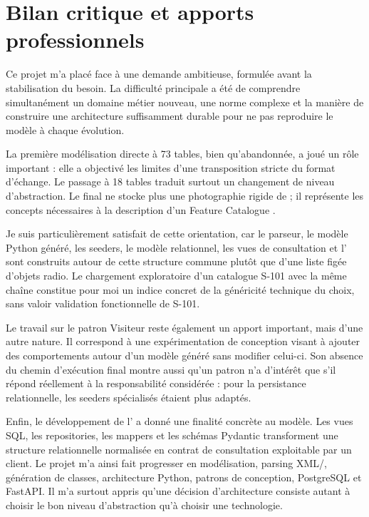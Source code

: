 \section{Bilan critique et apports professionnels}

Ce projet m'a placé face à une demande ambitieuse, formulée avant la stabilisation du besoin. La difficulté principale a été de comprendre simultanément un domaine métier nouveau, une norme complexe et la manière de construire une architecture suffisamment durable pour ne pas reproduire le modèle à chaque évolution.

La première modélisation directe à 73 tables, bien qu'abandonnée, a joué un rôle important : elle a objectivé les limites d'une transposition stricte du format d'échange. Le passage à 18 tables traduit surtout un changement de niveau d'abstraction. Le  final ne stocke plus une photographie rigide de  ; il représente les concepts nécessaires à la description d'un Feature Catalogue .

Je suis particulièrement satisfait de cette orientation, car le parseur, le modèle Python généré, les seeders, le modèle relationnel, les vues de consultation et l' sont construits autour de cette structure commune plutôt que d'une liste figée d'objets radio. Le chargement exploratoire d'un catalogue S-101 avec la même chaîne constitue pour moi un indice concret de la généricité technique du choix, sans valoir validation fonctionnelle de S-101.

Le travail sur le patron Visiteur reste également un apport important, mais d'une autre nature. Il correspond à une expérimentation de conception visant à ajouter des comportements autour d'un modèle généré sans modifier celui-ci. Son absence du chemin d'exécution final montre aussi qu'un patron n'a d'intérêt que s'il répond réellement à la responsabilité considérée : pour la persistance relationnelle, les seeders spécialisés étaient plus adaptés.

Enfin, le développement de l' a donné une finalité concrète au modèle. Les vues SQL, les repositories, les mappers et les schémas Pydantic transforment une structure relationnelle normalisée en contrat de consultation exploitable par un client. Le projet m'a ainsi fait progresser en modélisation, parsing XML/, génération de classes, architecture Python, patrons de conception, PostgreSQL et FastAPI. Il m'a surtout appris qu'une décision d'architecture consiste autant à choisir le bon niveau d'abstraction qu'à choisir une technologie.
